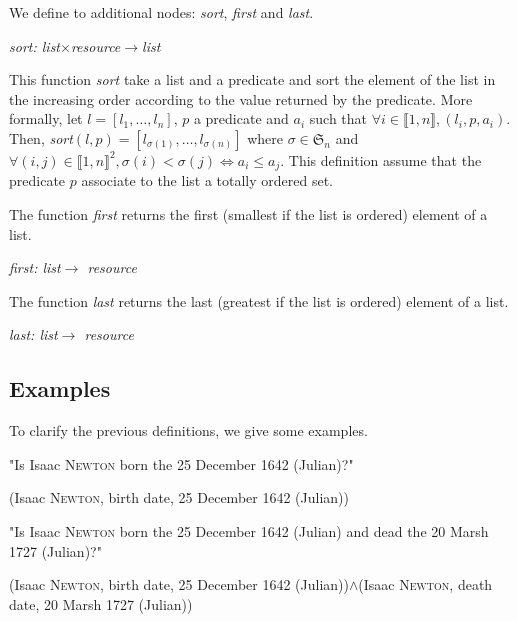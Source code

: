 We define to additional nodes: \textsl{sort}, \textsl{first} and \textsl{last}.

\begin{center}
\textsl{sort: list$\times$resource$\rightarrow$list}
\end{center}
This function \textsl{sort} take a list and a predicate and sort the element of the list in the increasing order according to the value returned by the predicate. More formally, let $l=[l_1,\ldots,l_n]$, $p$ a predicate and $a_i$ such that $\forall i\in\llbracket1,n\rrbracket, (l_i,p,a_i)$. Then, \textsl{sort}$(l,p) = [l_{\sigma(1)},\ldots,l_{\sigma(n)}]$ where $\sigma\in\mathfrak{S}_n$ and $\forall (i,j)\in\llbracket 1,n\rrbracket^2, \sigma(i)<\sigma(j) \Leftrightarrow a_i \leqslant a_j$. This definition assume that the predicate $p$ associate to the list a totally ordered set.

The function \textsl{first} returns the first (smallest if the list is ordered) element of a list.

\begin{center}
\textsl{first: list$\rightarrow$ resource}
\end{center}

The function \textsl{last} returns the last (greatest if the list is ordered) element of a list.

\begin{center}
\textsl{last: list$\rightarrow$ resource}
\end{center}

\subsection{Examples}

To clarify the previous definitions, we give some examples.

\bigskip

"Is Isaac \textsc{Newton} born the 25 December 1642 (Julian)?"
\begin{center}(Isaac \textsc{Newton}, birth date, 25 December 1642 (Julian))\end{center}

\bigskip

"Is Isaac \textsc{Newton} born the 25 December 1642 (Julian) and dead the 20 Marsh 1727 (Julian)?"
\begin{center}(Isaac \textsc{Newton}, birth date, 25 December 1642 (Julian))$\wedge$(Isaac \textsc{Newton}, death date, 20 Marsh 1727 (Julian))\end{center}

